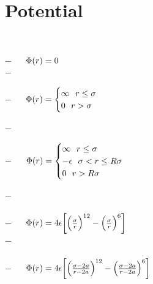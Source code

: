 \section{Potential}
\begin{mdframed}
    \vspace*{\baselineskip}
  
    ~~
    
    \tab $-$ ~~ $\pot(\pos) = 0 $ \\
    
    \tab $-$ ~~  \\
    

    \tab $-$ ~~ $\pot(\pos)=\begin{cases}
                    \infty ~~\pos \leq \molecrad\\
                    0 ~~ \pos > \molecrad\\
                \end{cases}$

    \tab $-$ ~~  \\
    
    
    \tab $-$ ~~ $\pot(\pos)=\begin{cases}
                    \infty ~~\pos \leq \molecrad\\
                    -\dielec ~~\molecrad < \pos \leq R\molecrad\\
                    0 ~~ \pos > R\molecrad\\
                \end{cases}$
                
    \tab $-$ ~~  \\
    
    \\
    
    \tab $-$ ~~ $\pot(\pos) = 4\dielec\bigg[\Big(\frac{\molecrad}{\pos}\Big)^{12}-\Big(\frac{\molecrad}{\pos}\Big)^6\bigg] $ \\
    
    \tab $-$ ~~  \\
    
    \\
    
    \tab $-$ ~~ $\pot(\pos) = 4\dielec\bigg[\Big(\frac{\molecrad-2\activity}{\pos-2\activity}\Big)^{12}-\Big(\frac{\molecrad-2\activity}{\pos-2\activity}\Big)^6\bigg] $ \\
    

\end{mdframed}
